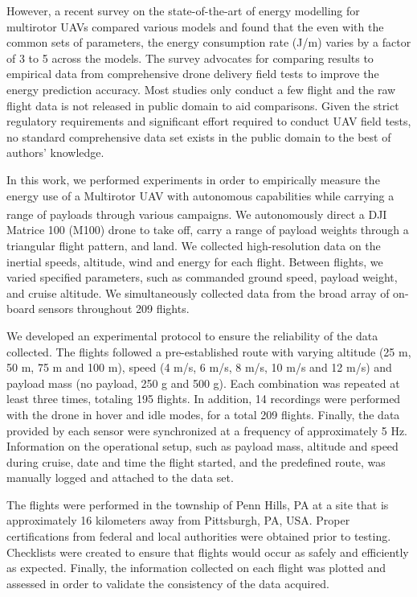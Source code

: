 \documentclass[fleqn,10pt]{wlscirep}
\begin{document}
However, a recent survey \cite{zhang2020energy} on the state-of-the-art of energy modelling for multirotor UAVs compared various models and found that the even with the common sets of parameters, the energy consumption rate (J/m) varies by a factor of 3 to 5 across the models. The survey advocates for comparing results to empirical data from comprehensive drone delivery field tests to improve the energy prediction accuracy. Most studies only conduct a few flight and the raw flight data is not released in public domain to aid comparisons. Given the strict regulatory requirements and significant effort required to conduct UAV field tests, no standard comprehensive data set exists in the public domain to the best of authors' knowledge.     
\par In this work, we performed experiments in order to empirically measure the energy use of a Multirotor UAV with autonomous capabilities while carrying a range of payloads through various campaigns. We autonomously direct a DJI\textsuperscript{\textregistered} Matrice 100 (M100) \cite{DJI} drone to take off, carry a range of payload weights through a triangular flight pattern, and land. We collected high-resolution data on the inertial speeds, altitude, wind and energy for each flight. Between flights, we varied specified parameters, such as commanded ground speed, payload weight, and cruise altitude. We simultaneously collected data from the broad array of on-board sensors throughout 209 flights.

We developed an experimental protocol to ensure the reliability of the data collected. The flights followed a pre-established route with varying altitude (25 m, 50 m, 75 m and 100 m), speed (4 m/s, 6 m/s, 8 m/s, 10 m/s and 12 m/s) and payload mass (no payload, 250 g and 500 g). Each combination was repeated at least three times, totaling 195 flights. In addition, 14 recordings were performed with the drone in hover and idle modes, for a total 209 flights. Finally, the data provided by each sensor were synchronized at a frequency of approximately 5 Hz. Information on the operational setup, such as payload mass, altitude and speed during cruise, date and time the flight started, and the predefined route, was manually logged and attached to the data set.

The flights were performed in the township of Penn Hills, PA at a site  that is approximately 16 kilometers away from Pittsburgh, PA, USA. Proper certifications from federal and local authorities were obtained prior to testing. Checklists were created to ensure that flights would occur as safely and efficiently as expected. Finally, the information collected on each flight was plotted and assessed in order to validate the consistency of the data acquired. 
\end{document}
